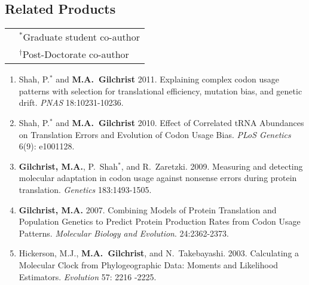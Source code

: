 \documentclass[10pt]{article}
\begin{document}
\subsection*{Related Products}
\begin{tabular}{ll}
  \hspace*{0.5in} &$^*$Graduate student co-author \\
   &  $^\dagger$Post-Doctorate co-author \\
\end{tabular}

\begin{enumerate}
\item Shah, P.$^*$ and \textbf{M.A.~Gilchrist} 2011. Explaining complex codon usage patterns with selection for translational efficiency, mutation bias, and genetic drift. \emph{PNAS} 18:10231-10236. %

\item Shah, P.$^*$ and \textbf{M.A.~Gilchrist} 2010. Effect of Correlated tRNA Abundances on Translation Errors and Evolution of Codon Usage Bias. \emph{PLoS Genetics} 6(9): e1001128. %

\item \textbf{Gilchrist, M.A.}, P.~Shah$^*$, and  R.~Zaretzki. 2009.  Measuring and detecting molecular adaptation in codon usage against nonsense errors during protein translation.  \emph{Genetics} 183:1493-1505.


\item \textbf{Gilchrist, M.A.} 2007. Combining Models of Protein Translation and Population Genetics to Predict Protein Production Rates from Codon Usage Patterns. \emph{Molecular Biology and Evolution}. 24:2362-2373.






\item Hickerson, M.J., \textbf{M.A.~Gilchrist}, and N.~Takebayashi. 2003. Calculating a Molecular Clock from Phylogeographic Data: Moments and Likelihood Estimators. \emph{Evolution} 57: 2216 -2225. 



  
\end{enumerate}
\end{document}
